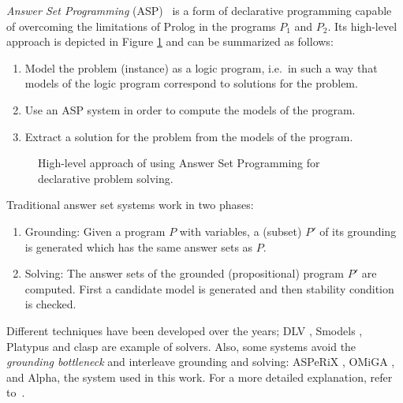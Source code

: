 \emph{Answer Set Programming} (ASP)~\cite{aspPrime} is a form of declarative programming 
capable of overcoming the limitations of Prolog in the programs \(P_1\) and \(P_2\).
Its high-level approach is depicted in Figure \ref{fig:ASP1} and can be summarized as follows:
\begin{enumerate}
\item Model the problem (instance) as a logic program, i.e.~in such a way that models of the logic program correspond to solutions for the problem.
\item Use an ASP system in order to compute the models of the program.
\item Extract a solution for the problem from the models of the program.
\end{enumerate}
\begin{figure}
  \begin{center}
  \end{center}
  \caption{High-level approach of using Answer Set Programming for declarative problem solving.}
  \label{fig:ASP1}
\end{figure}
 
Traditional answer set systems work in two phases:
\begin{enumerate}
\item Grounding: Given a program \(P\) with variables, a (subset) \(P'\) of its grounding is generated which has the same answer sets as \(P\).
\item Solving: The answer sets of the grounded (propositional) program \(P'\) are computed. First a candidate model is generated and then stability condition is checked.
\end{enumerate}

Different techniques have been developed over the years; DLV \cite{dlv}, Smodels \cite{smodels}, Platypus \cite{platypus} and clasp \cite{clasp} are example of solvers. Also, some systems avoid the \emph{grounding bottleneck} and interleave grounding and solving: ASPeRiX \cite{asperix,fofchain}, OMiGA \cite{omiga}, and Alpha, the system used in this work. For a more detailed explanation, refer to~\cite{primer,aspbook}.

